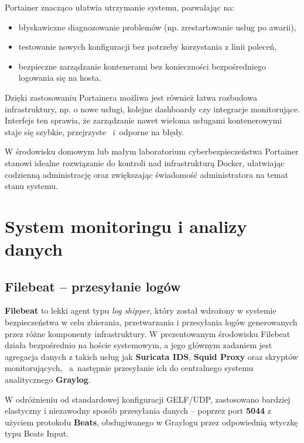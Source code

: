 \documentclass[
    left=2.5cm,         %
    right=2.5cm,        %
    top=2.5cm,          %
    bottom=3cm,         %
    bindingoffset=6mm,  %
    nohyphenation=true %
]{eiti/eiti-thesis} %
\begin{document}
Portainer znacząco ułatwia utrzymanie systemu, pozwalając na:
\begin{itemize}
    \item błyskawiczne diagnozowanie problemów (np. zrestartowanie usług po awarii),
    \item testowanie nowych konfiguracji bez potrzeby korzystania z linii poleceń,
    \item bezpieczne zarządzanie kontenerami bez konieczności bezpośredniego logowania się na hosta.
\end{itemize}

Dzięki zastosowaniu Portainera możliwa jest również łatwa rozbudowa infrastruktury, np. o nowe usługi, kolejne dashboardy czy integracje monitorujące. Interfejs 
ten sprawia, że zarządzanie nawet wieloma usługami kontenerowymi staje się szybkie, przejrzyste ~i~odporne na błędy.

W środowisku domowym lub małym laboratorium cyberbezpieczeństwa Portainer stanowi idealne rozwiązanie do kontroli nad infrastrukturą Docker, ułatwiając codzienną administrację oraz zwiększając świadomość administratora na temat stanu systemu.


\newpage 
\section{System monitoringu i analizy danych}

\subsection{Filebeat – przesyłanie logów}

\textbf{Filebeat}\cite{filebeat-docs} to lekki agent typu \textit{log shipper}, który został wdrożony w systemie bezpieczeństwa w celu zbierania, przetwarzania 
i przesyłania logów generowanych przez różne komponenty infrastruktury. W prezentowanym środowisku Filebeat działa bezpośrednio na hoście systemowym\cite{config-filebeat}, a jego głównym zadaniem jest agregacja danych z takich usług jak \textbf{Suricata IDS}, \textbf{Squid Proxy} oraz skryptów monitorujących, ~a~następnie przesyłanie ich do centralnego systemu analitycznego \textbf{Graylog}.

W odróżnieniu od standardowej konfiguracji GELF/UDP, zastosowano bardziej elastyczny i niezawodny sposób przesyłania danych – poprzez port \textbf{5044} z użyciem protokołu \textbf{Beats}, obsługiwanego w Graylogu przez odpowiednią wtyczkę typu Beats Input.
\end{document}
